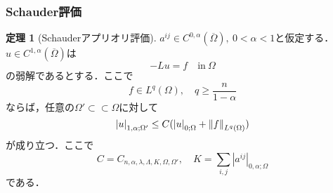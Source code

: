 \documentclass[a4paper]{ltjsarticle}
\newcommand{\Om}{\Omega}
\newcommand{\Ombar}{\overline{\Omega}}
\newcommand{\ssubset}{\subset\subset}
\newcommand{\inn}{\quad\text{in}\ }
\newcommand{\1}{\mathbbm{1}}
\numberwithin{equation}{section}
\theoremstyle{definition}
\newtheorem{thm}{定理}[section]
\begin{document}
\subsubsection{Schauder評価}
\begin{thm}[Schauderアプリオリ評価]\label{thm:schauder_divergence}
    $a^{ij}\in C^{0,\alpha}(\Ombar),\ 0<\alpha<1$と仮定する．$u\in C^{1,\alpha}(\Ombar)$は
    \begin{equation}
        -Lu=f\inn\Om 
    \end{equation}
    の弱解であるとする．ここで
    \begin{equation}
        f\in L^q(\Om),\quad q\geq \frac{n}{1-\alpha}
    \end{equation}
    ならば，任意の$\Om'\ssubset \Om$に対して
    \begin{equation}
        \abs{u}_{1,\alpha;\Om'}\leq C(\abs{u}_{0;\Om}+\norm{f}_{L^q(\Om)})
    \end{equation}
    が成り立つ．ここで
    \begin{equation}
        C=C_{n,\alpha,\lambda,\Lambda,K,\Om,\Om'},\quad K=\sum_{i,j}|a^{ij}|_{0,\alpha;\Om}
    \end{equation}
    である．
\end{thm}
\end{document}
